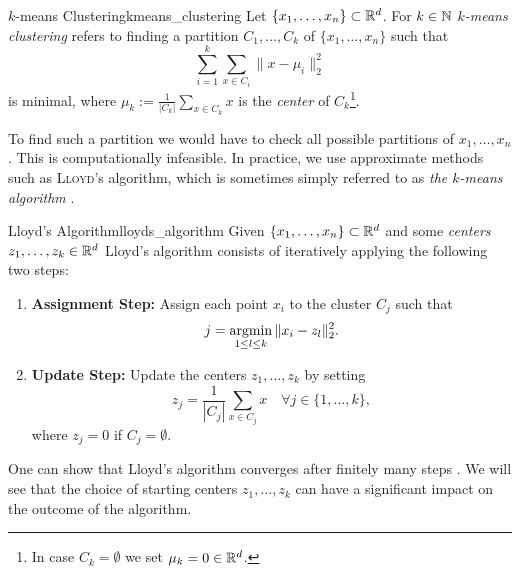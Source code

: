 \begin{definition}{$k$-means Clustering}{kmeans_clustering}
Let $\{x_1, \dots, x_n\} \subset \mathbb R^d$. For $k \in \mathbb N$ \emph{$k$-means clustering} refers to finding a partition $C_1, \dots, C_k$ of $\{x_1, \dots, x_n\}$ such that
\begin{equation*}
\label{eq:kmean_optimization}
    \sum_{i = 1}^k \sum_{x \in C_i} \|x - \mu_i\|^2_2
\end{equation*}
is minimal, where $\mu_k := \frac{1}{|C_k|}\sum_{x \in C_k} x$ is the \emph{center} of $C_k$\footnote{In case $C_k = \emptyset$ we set $\mu_k = 0 \in \mathbb R^d$.}.
\end{definition}
To find such a partition we would have to check all possible partitions of $x_1, \dots, x_n$. This is computationally infeasible. In practice, we use approximate methods such as \textsc{Lloyd}'s algorithm, which is sometimes simply referred to as \emph{the $k$-means algorithm} \cite[Sec.~3.1.2]{Scitovski2021}.

\begin{definition}{Lloyd's Algorithm}{lloyds_algorithm}
Given $\{x_1, \dots, x_n\} \subset \mathbb R^d$ and some \emph{centers} $z_1, \dots, z_k \in \mathbb R^d$
Lloyd's algorithm consists of iteratively applying the following two steps:

\begin{enumerate}
    \item \textbf{Assignment Step:} Assign each point $x_i$ to the cluster $C_j$ such that
    $$
    j = \operatorname*{argmin}_{1 \leq l \leq k} \|x_i - z_l\|^2_2.
    $$

    \item \textbf{Update Step:} Update the centers $z_1, \dots, z_k$ by setting
    $$
    z_j = \frac{1}{|C_j|}\sum_{x \in C_j} x \quad \forall j \in \{1, \dots, k\},
    $$
    where $z_j = 0$ if $C_j = \emptyset$. 
\end{enumerate}
\end{definition}

One can show that Lloyd's algorithm converges after finitely many steps \cite[Thm.~3.14]{Scitovski2021}.
We will see that the choice of starting centers $z_1, \dots, z_k$ can have a significant impact on the outcome of the algorithm.

